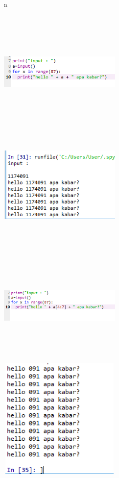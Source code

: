 \begin{enumerate}
\begin{figure}
\item a
\end{figure}
\begin{figure}
\item
\center
\includegraphics[width=6cm,height=6cm]{figures/c10.png}
\includegraphics[width=6cm,height=6cm]{figures/c11.png}
\end{figure}
\begin{figure}
\item
\center
\includegraphics[width=6cm,height=6cm]{figures/c12.png}
\includegraphics[width=6cm,height=6cm]{figures/c13.png}

\end{figure}
\end{enumerate}

